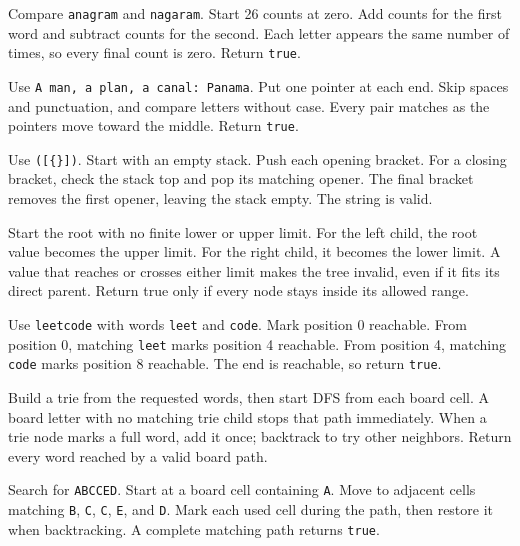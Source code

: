 \expandafter\def\csname lessontrace@64\endcsname{\visualtrace
  {Compare \texttt{anagram} and \texttt{nagaram}. Start 26 counts at zero.}
  {Add counts for the first word and subtract counts for the second.}
  {Each letter appears the same number of times, so every final count is zero.}
  {Return \texttt{true}.}}

\expandafter\def\csname lessontrace@65\endcsname{\visualtrace
  {Use \texttt{A man, a plan, a canal: Panama}. Put one pointer at each end.}
  {Skip spaces and punctuation, and compare letters without case.}
  {Every pair matches as the pointers move toward the middle.}
  {Return \texttt{true}.}}

\expandafter\def\csname lessontrace@66\endcsname{\visualtrace
  {Use \texttt{([\{\}])}. Start with an empty stack.}
  {Push each opening bracket. For a closing bracket, check the stack top and pop its matching opener.}
  {The final bracket removes the first opener, leaving the stack empty.}
  {The string is valid.}}

\expandafter\def\csname lessontrace@67\endcsname{\visualtrace
  {Start the root with no finite lower or upper limit.}
  {For the left child, the root value becomes the upper limit. For the right child, it becomes the lower limit.}
  {A value that reaches or crosses either limit makes the tree invalid, even if it fits its direct parent.}
  {Return true only if every node stays inside its allowed range.}}

\expandafter\def\csname lessontrace@68\endcsname{\visualtrace
  {Use \texttt{leetcode} with words \texttt{leet} and \texttt{code}. Mark position 0 reachable.}
  {From position 0, matching \texttt{leet} marks position 4 reachable.}
  {From position 4, matching \texttt{code} marks position 8 reachable.}
  {The end is reachable, so return \texttt{true}.}}

\expandafter\def\csname lessontrace@69\endcsname{\visualtrace
  {Build a trie from the requested words, then start DFS from each board cell.}
  {A board letter with no matching trie child stops that path immediately.}
  {When a trie node marks a full word, add it once; backtrack to try other neighbors.}
  {Return every word reached by a valid board path.}}

\expandafter\def\csname lessontrace@70\endcsname{\visualtrace
  {Search for \texttt{ABCCED}. Start at a board cell containing \texttt{A}.}
  {Move to adjacent cells matching \texttt{B}, \texttt{C}, \texttt{C}, \texttt{E}, and \texttt{D}.}
  {Mark each used cell during the path, then restore it when backtracking.}
  {A complete matching path returns \texttt{true}.}}

